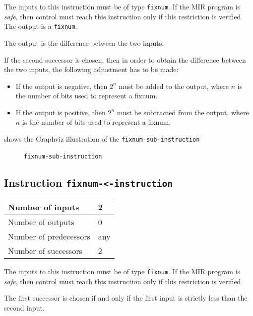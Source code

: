 The inputs to this instruction must be of type \texttt{fixnum}.  If the
MIR program is \emph{safe}, then control must reach this instruction
only if this restriction is verified.  The output is a
\texttt{fixnum}.  

The output is the difference between the two inputs.

If the second successor is chosen, then in order to obtain the difference
between the two inputs, the following adjustment has to be made:

\begin{itemize}
\item If the output is negative, then $2^n$ must be added to the
  output, where $n$ is the number of bits used to represent a fixnum. 
\item If the output is positive, then $2^n$ must be subtracted from
  the output, where $n$ is the number of bits used to represent a
  fixnum.
\end{itemize}

 shows the Graphviz illustration of the
\texttt{fixnum-sub-instruction}

\begin{figure}
\begin{center}
\end{center}
\caption{\label{fig-fixnum-sub-instruction}
\texttt{fixnum-sub-instruction}.}
\end{figure}

\subsection{Instruction \texttt{fixnum-<-instruction}}
\label{mir-instruction-fixnum-less}

\begin{tabular}{|l|l|}
\hline
Number of inputs & 2\\
\hline
Number of outputs & 0\\
\hline
Number of predecessors & any\\
\hline
Number of successors & 2\\
\hline
\end{tabular}

The inputs to this instruction must be of type \texttt{fixnum}.  If the
MIR program is \emph{safe}, then control must reach this instruction
only if this restriction is verified.

The first successor is chosen if and only if the first input is
strictly less than the second input.

